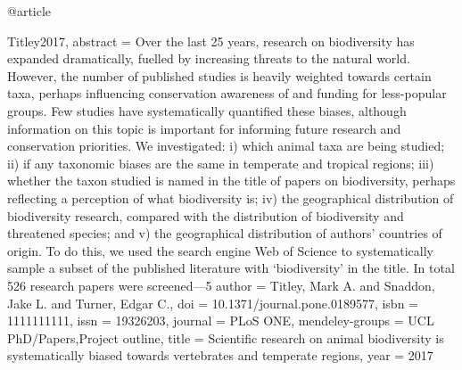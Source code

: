 {{{@article{Titley2017,
abstract = {Over the last 25 years, research on biodiversity has expanded dramatically, fuelled by increasing threats to the natural world. However, the number of published studies is heavily weighted towards certain taxa, perhaps influencing conservation awareness of and funding for less-popular groups. Few studies have systematically quantified these biases, although information on this topic is important for informing future research and conservation priorities. We investigated: i) which animal taxa are being studied; ii) if any taxonomic biases are the same in temperate and tropical regions; iii) whether the taxon studied is named in the title of papers on biodiversity, perhaps reflecting a perception of what biodiversity is; iv) the geographical distribution of biodiversity research, compared with the distribution of biodiversity and threatened species; and v) the geographical distribution of authors' countries of origin. To do this, we used the search engine Web of Science to systematically sample a subset of the published literature with ‘biodiversity' in the title. In total 526 research papers were screened—5%
author = {Titley, Mark A. and Snaddon, Jake L. and Turner, Edgar C.},
doi = {10.1371/journal.pone.0189577},
isbn = {1111111111},
issn = {19326203},
journal = {PLoS ONE},
mendeley-groups = {UCL PhD/Papers,Project outline},
title = {{Scientific research on animal biodiversity is systematically biased towards vertebrates and temperate regions}},
year = {2017}
}

}}}}
